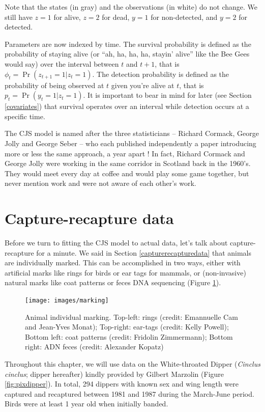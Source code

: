 \documentclass[
  12pt,
]{krantz}
\begin{document}
Note that the states (in gray) and the observations (in white) do not change. We still have \(z = 1\) for alive, \(z = 2\) for dead, \(y = 1\) for non-detected, and \(y = 2\) for detected.

Parameters are now indexed by time. The survival probability is defined as the probability of staying alive (or ``ah, ha, ha, ha, stayin' alive'' like the Bee Gees would say) over the interval between \(t\) and \(t+1\), that is \(\phi_t = \Pr(z_{t+1} = 1 | z_t = 1)\). The detection probability is defined as the probability of being observed at \(t\) given you're alive at \(t\), that is \(p_t = \Pr(y_{t} = 1 | z_t = 1)\). It is important to bear in mind for later (see Section \ref{covariates}) that survival operates over an interval while detection occurs at a specific time.

The CJS model is named after the three statisticians -- Richard Cormack, George Jolly and George Seber -- who each published independently a paper introducing more or less the same approach, a year apart ! In fact, Richard Cormack and George Jolly were working in the same corridor in Scotland back in the 1960's. They would meet every day at coffee and would play some game together, but never mention work and were not aware of each other's work.

\section{Capture-recapture data}\label{capture-recapture-data}

Before we turn to fitting the CJS model to actual data, let's talk about capture-recapture for a minute. We said in Section \ref{capturerecapturedata} that animals are individually marked. This can be accomplished in two ways, either with artificial marks like rings for birds or ear tags for mammals, or (non-invasive) natural marks like coat patterns or feces DNA sequencing (Figure \ref{fig:marking}).

\begin{figure}
\texttt{[image: images/marking]} \caption{Animal individual marking. Top-left: rings (credit: Emannuelle Cam and Jean-Yves Monat); Top-right: ear-tags (credit: Kelly Powell); Bottom left: coat patterns (credit: Fridolin Zimmermann); Bottom right: ADN feces (credit: Alexander Kopatz)}\label{fig:marking}
\end{figure}

Throughout this chapter, we will use data on the White-throated Dipper (\emph{Cinclus cinclus}; dipper hereafter) kindly provided by Gilbert Marzolin (Figure \ref{fig:pixdipper}). In total, 294 dippers with known sex and wing length were captured and recaptured between 1981 and 1987 during the March-June period. Birds were at least 1 year old when initially banded.
\end{document}
